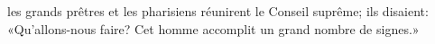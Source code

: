 \encetemps les grands prêtres et les pharisiens réunirent le Conseil suprême;
	ils disaient: «Qu’allons-nous faire?
	Cet homme accomplit un grand nombre de signes.»
